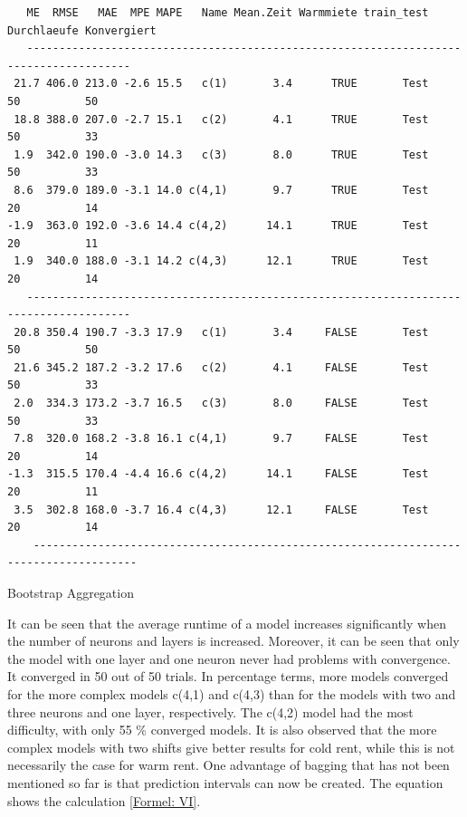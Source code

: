 \begin{table}[H]
 	\begin{verbatim}
   ME  RMSE   MAE  MPE MAPE   Name Mean.Zeit Warmmiete train_test Durchlaeufe Konvergiert
   --------------------------------------------------------------------------------------
 21.7 406.0 213.0 -2.6 15.5   c(1)       3.4      TRUE       Test          50          50
 18.8 388.0 207.0 -2.7 15.1   c(2)       4.1      TRUE       Test          50          33
 1.9  342.0 190.0 -3.0 14.3   c(3)       8.0      TRUE       Test          50          33
 8.6  379.0 189.0 -3.1 14.0 c(4,1)       9.7      TRUE       Test          20          14
-1.9  363.0 192.0 -3.6 14.4 c(4,2)      14.1      TRUE       Test          20          11
 1.9  340.0 188.0 -3.1 14.2 c(4,3)      12.1      TRUE       Test          20          14
   --------------------------------------------------------------------------------------
 20.8 350.4 190.7 -3.3 17.9   c(1)       3.4     FALSE       Test          50          50
 21.6 345.2 187.2 -3.2 17.6   c(2)       4.1     FALSE       Test          50          33
 2.0  334.3 173.2 -3.7 16.5   c(3)       8.0     FALSE       Test          50          33
 7.8  320.0 168.2 -3.8 16.1 c(4,1)       9.7     FALSE       Test          20          14
-1.3  315.5 170.4 -4.4 16.6 c(4,2)      14.1     FALSE       Test          20          11
 3.5  302.8 168.0 -3.7 16.4 c(4,3)      12.1     FALSE       Test          20          14
    --------------------------------------------------------------------------------------
 	\end{verbatim}
 \caption{Bootstrap Aggregation}
 \label{tbl: bagging}
\end{table}

	It can be seen that the average runtime of a model increases significantly when the number of neurons and layers is increased. Moreover, it can be seen that only the model with one layer and one neuron never had problems with convergence. It converged in 50 out of 50 trials. In percentage terms, more models converged for the more complex models c(4,1) and c(4,3) than for the models with two and three neurons and one layer, respectively. The c(4,2) model had the most difficulty, with only 55 \% converged models. It is also observed that the more complex models with two shifts give better results for cold rent, while this is not necessarily the case for warm rent. One advantage of bagging that has not been mentioned so far is that prediction intervals can now be created. The equation shows the calculation \ref{Formel: VI}.

